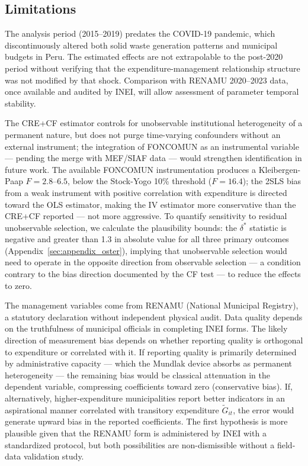 \subsection{Limitations}
\label{sec:limitaciones}

The analysis period (2015--2019) predates the COVID-19 pandemic, which discontinuously altered both solid waste generation patterns and municipal budgets in Peru. The estimated effects are not extrapolable to the post-2020 period without verifying that the expenditure-management relationship structure was not modified by that shock. Comparison with RENAMU 2020--2023 data, once available and audited by INEI, will allow assessment of parameter temporal stability.

The CRE+CF estimator controls for unobservable institutional heterogeneity of a permanent nature, but does not purge time-varying confounders without an external instrument; the integration of FONCOMUN as an instrumental variable --- pending the merge with MEF/SIAF data --- would strengthen identification in future work. The available FONCOMUN instrumentation produces a Kleibergen-Paap $F = 2.8$--$6.5$, below the Stock-Yogo 10\% threshold ($F = 16.4$); the 2SLS bias from a weak instrument with positive correlation with expenditure is directed toward the OLS estimator, making the IV estimator more conservative than the CRE+CF reported --- not more aggressive. To quantify sensitivity to residual unobservable selection, we calculate the \citet{Oster2019} plausibility bounds: the $\delta^*$ statistic is negative and greater than 1.3 in absolute value for all three primary outcomes (Appendix~\ref{sec:appendix_oster}), implying that unobservable selection would need to operate in the opposite direction from observable selection --- a condition contrary to the bias direction documented by the CF test --- to reduce the effects to zero.

The management variables come from RENAMU (National Municipal Registry), a statutory declaration without independent physical audit. Data quality depends on the truthfulness of municipal officials in completing INEI forms. The likely direction of measurement bias depends on whether reporting quality is orthogonal to expenditure or correlated with it. If reporting quality is primarily determined by administrative capacity --- which the Mundlak device absorbs as permanent heterogeneity --- the remaining bias would be classical attenuation in the dependent variable, compressing coefficients toward zero (conservative bias). If, alternatively, higher-expenditure municipalities report better indicators in an aspirational manner correlated with transitory expenditure $\tilde{G}_{it}$, the error would generate upward bias in the reported coefficients. The first hypothesis is more plausible given that the RENAMU form is administered by INEI with a standardized protocol, but both possibilities are non-dismissible without a field-data validation study.

